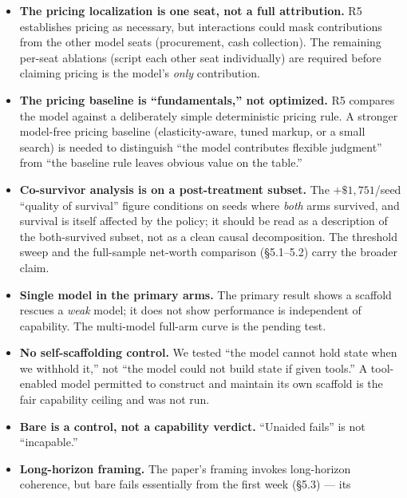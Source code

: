 \documentclass[11pt]{article}
\begin{document}
\begin{itemize}
only 0.2\% of money actions and the procurement/vendor subsystem is lightly
exercised, so the ``gates not necessary'' finding is scoped to \emph{this
proposal distribution} and does not establish that guardrails are unimportant
to agent performance in general. A targeted experiment constructed to contain
high-risk situations where gates actually bind is needed to evaluate their
value where it would matter.
\item \textbf{The pricing localization is one seat, not a full attribution.}
R5 establishes pricing as necessary, but interactions could mask contributions
from the other model seats (procurement, cash collection). The remaining
per-seat ablations (script each other seat individually) are required before
claiming pricing is the model's \emph{only} contribution.
\item \textbf{The pricing baseline is ``fundamentals,'' not optimized.} R5
compares the model against a deliberately simple deterministic pricing rule. A
stronger model-free pricing baseline (elasticity-aware, tuned markup, or a small
search) is needed to distinguish ``the model contributes flexible judgment''
from ``the baseline rule leaves obvious value on the table.''
\item \textbf{Co-survivor analysis is on a post-treatment subset.} The
$+\$1,751$/seed ``quality of survival'' figure conditions on seeds where
\emph{both} arms survived, and survival is itself affected by the policy; it
should be read as a description of the both-survived subset, not as a clean
causal decomposition. The threshold sweep and the full-sample net-worth
comparison (\S5.1--5.2) carry the broader claim.
\item \textbf{Single model in the primary arms.} The primary result shows a
scaffold rescues a \emph{weak} model; it does not show performance is
independent of capability. The multi-model full-arm curve is the pending test.
\item \textbf{No self-scaffolding control.} We tested ``the model cannot hold
state when we withhold it,'' not ``the model could not build state if given
tools.'' A tool-enabled model permitted to construct and maintain its own
scaffold is the fair capability ceiling and was not run.
\item \textbf{Bare is a control, not a capability verdict.} ``Unaided fails''
is not ``incapable.''
\item \textbf{Long-horizon framing.} The paper's framing invokes long-horizon
coherence, but bare fails essentially from the first week (\S5.3) --- its

\end{itemize}
\end{document}
